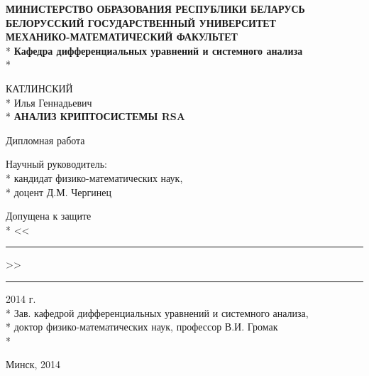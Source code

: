 \begin{titlepage}
	\newpage

	\begin{center}
		\textbf{МИНИСТЕРСТВО ОБРАЗОВАНИЯ РЕСПУБЛИКИ БЕЛАРУСЬ} \\
		\vspace{0.5cm}
		\textbf{БЕЛОРУССКИЙ ГОСУДАРСТВЕННЫЙ УНИВЕРСИТЕТ} \\
		\vspace{0.5cm}		
		\textbf{МЕХАНИКО-МАТЕМАТИЧЕСКИЙ ФАКУЛЬТЕТ} \\*
		\vspace{0.5cm}
		\textbf{Кафедра дифференциальных уравнений и системного анализа} \\*
	\end{center}

	\vspace{5em}

	\begin{center}
		КАТЛИНСКИЙ \\*
		Илья Геннадьевич \\*
		\vspace{0.5cm}
		\textbf{АНАЛИЗ КРИПТОСИСТЕМЫ RSA}
	\end{center}

	\vspace{2.5em}
	 
	\begin{center}
		Дипломная работа
	\end{center}

	\vspace{6em}
	 
	\begin{flushright}
		Научный руководитель: \\*
		кандидат физико-математических наук, \\*
		доцент Д.М. Чергинец	
	\end{flushright}

	\begin{flushleft}
		Допущена к защите \\*
		\vspace{0.2cm}
		<<\rule{1cm}{0.1pt}>> \rule{4cm}{0.1pt} 2014 г.\\*
		\vspace{0.2cm}
		Зав. кафедрой дифференциальных уравнений и системного анализа, \\*
		доктор физико-математических наук, профессор В.И. Громак \\*		
	\end{flushleft}
	 
	\vspace{\fill}

	\begin{center}
		Минск, 2014
	\end{center}

\end{titlepage}